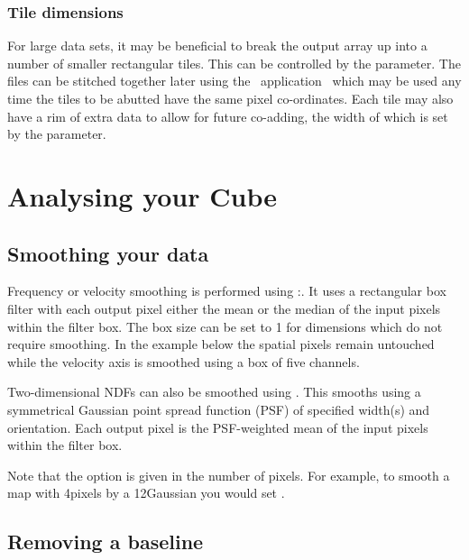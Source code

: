 \documentclass[11pt,oneside,chapters]{starlink}
\begin{document}
\subsection{Tile dimensions}

For large data sets, it may be beneficial to break the output array up
into a number of smaller rectangular tiles. This can be controlled by
the  parameter.  The files can be stitched together
later using the \Kappa\ application \paste\ which may be used any time
the tiles to be abutted have the same pixel co-ordinates.  Each tile
may also have a rim of extra data to allow for future co-adding,
the width of which is set by the  parameter.


\clearpage
\chapter{Analysing your Cube}
\label{sec:analyse}

\section{Smoothing your data}

Frequency or velocity smoothing is performed using \Kappa:\block. It
uses a rectangular box filter with each output pixel either the mean
or the median of the input pixels within the filter box. The box size
can be set to 1 for dimensions which do not require smoothing. In the
example below the spatial pixels remain untouched while the velocity
axis is smoothed using a box of five channels.
\begin{terminalv}
\end{terminalv}

Two-dimensional NDFs can also be smoothed using \gausmooth. This
smooths using a symmetrical Gaussian point spread function (PSF) of
specified width(s) and orientation. Each output pixel is the
PSF-weighted mean of the input pixels within the filter box.

\begin{terminalv}
\end{terminalv}
Note that the  option is given in the number of pixels.
For example, to smooth a map with 4\arcsec pixels by a 12\arcsec Gaussian
you would set .

\section{Removing a baseline}
\end{document}
